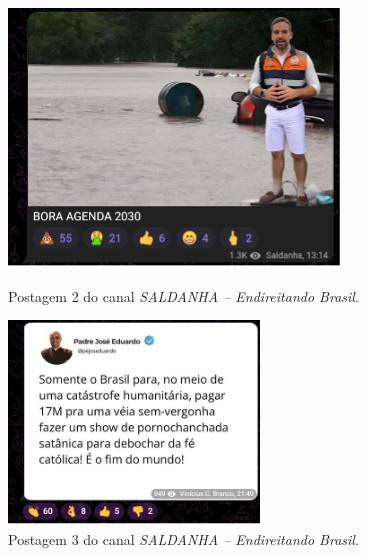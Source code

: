 \documentclass[portuguese]{textolivre}
\begin{document}
\begin{figure}[h!]
\begin{minipage}[t]{0.3\textwidth}
        \includegraphics[width=\linewidth]{Imagens/Fig34.png}
        \caption{Postagem 2 do canal \emph{SALDANHA -- Endireitando Brasil}.}
        \label{fig-34}
    \end{minipage}
    \hfill
    \begin{minipage}[t]{0.3\textwidth}
        \centering
        \includegraphics[width=\linewidth]{Imagens/Fig35.png}
        \caption{Postagem 3 do canal \emph{SALDANHA -- Endireitando Brasil}.}
        \label{fig-35}
    \end{minipage}

    \vspace{0.5cm} %


\end{figure}
\end{document}
